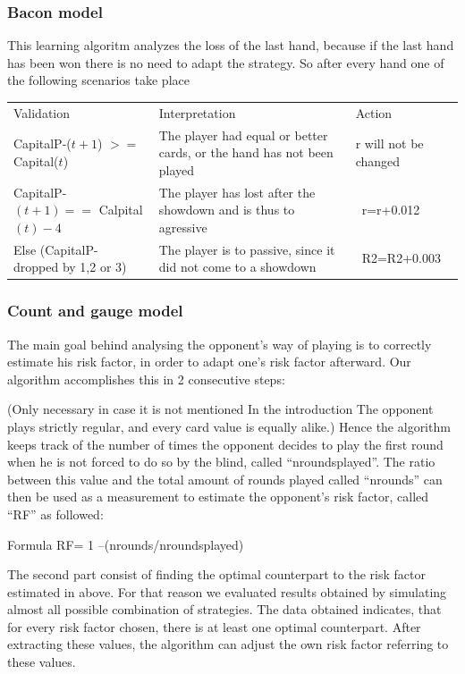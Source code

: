 \documentclass[11pt]{article}
\begin{document}
\subsubsection{Bacon model}
This learning algoritm analyzes the loss of the last hand, because if the last hand has been won there is no need to adapt the strategy. So after every hand one of the following scenarios take place\\
\renewcommand{\arraystretch}{1.4}
\begin{tabular}{ p{6.45cm}   p{5.1cm}  p{2.4cm}}
Validation & Interpretation & Action\\
\addlinespace
CapitalP-($t+1$) $>=$ Capital($t$) &	The player had equal or better cards, or the hand has not been played&
r will not be changed \\
\addlinespace
CapitalP-$(t+1) ==$ Calpital$(t)-4$	&	The player has lost after the showdown and is thus to agressive & \ r=r+0.012\\
\addlinespace
Else (CapitalP- dropped by 1,2 or 3) &	The player is to passive, since it did not come to a showdown & \ R2=R2+0.003\\


\end{tabular}

\subsubsection{Count and gauge model}

The main goal behind analysing the opponent’s way of playing is to correctly estimate his risk factor, in order to adapt one’s risk factor afterward. 
Our algorithm accomplishes this in 2 consecutive steps:
 
(Only necessary in case it is not mentioned In the introduction The opponent plays strictly regular, and every card value is equally alike.) Hence the algorithm keeps track of the number of times the opponent decides to play the first round when he is not forced to do so by the blind, called “nroundsplayed”. The ratio between this value and the total amount of rounds played called “nrounds” can then be used as a measurement to estimate the opponent’s risk factor, called “RF” as followed:
 
Formula RF= 1 –(nrounds/nroundsplayed)
 
The second part consist of finding the optimal counterpart to the risk factor estimated in above. For that reason we evaluated results obtained by simulating almost all possible combination of strategies. The data obtained indicates, that for every risk factor chosen, there is at least one optimal counterpart. After extracting these values, the algorithm can adjust the own risk factor referring to these values.
 
\end{document}
